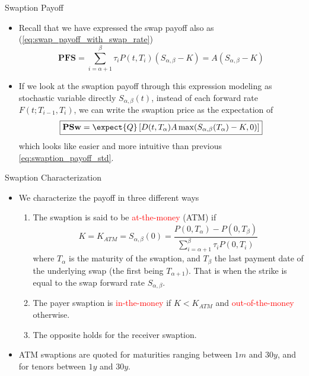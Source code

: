 \documentclass{beamer}
\begin{document}
\begin{frame}{Swaption Payoff}
\begin{itemize}
	\item<1-> Recall that we have expressed the swap payoff also as (\cref{eq:swap_payoff_with_swap_rate})
	\begin{equation*}
	\textbf{PFS}=\sum_{i=\alpha+1}^\beta \tau_i P(t,T_i)(S_{\alpha,\beta}-K) = A(S_{\alpha,\beta}-K)
	\end{equation*}
	\item<2-> If we look at the swaption payoff through this expression modeling as stochastic variable directly $S_{\alpha,\beta}(t)$, instead of each forward rate $F(t;T_{i-1},T_i)$, we can write the swaption price as the expectation of
	\begin{equation}
		\boxed{\textbf{PSw}=\expect{Q}\left[D(t,T_\alpha)A\max(S_{\alpha,\beta}(T_\alpha)-K, 0)\right]}
	\end{equation}
	which looks like easier and more intuitive than previous \cref{eq:swaption_payoff_std}.
\end{itemize}
\end{frame}

\begin{frame}{Swaption Characterization}
	\begin{itemize}	
		\item We characterize the payoff in three different ways
		\begin{enumerate}
			\item The swaption is said to be \textcolor{red}{at-the-money} (ATM) if
			\begin{equation*}
				K = K_{ATM} = S_{\alpha,\beta}(0) = \frac{P(0,T_\alpha)-P(0,T_\beta)}{\sum_{i=\alpha+1}^\beta \tau_i P(0,T_i)}
			\end{equation*}
			where $T_\alpha$ is the maturity of the swaption, and $T_\beta$ the last payment date of the underlying swap (the first being $T_{\alpha+1})$. That is when the strike is equal to the swap forward rate $S_{\alpha,\beta}$.
			\item The payer swaption is \textcolor{red}{in-the-money} if $K<K_{ATM}$ and \textcolor{red}{out-of-the-money} otherwise.
			\item The opposite holds for the receiver swaption.
		\end{enumerate}
		\item ATM swaptions are quoted for maturities ranging between $1m$ and $30y$, and for tenors between $1y$ and $30y$.
	\end{itemize}
\end{frame}
\end{document}
